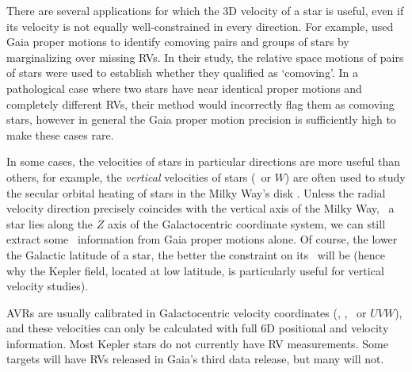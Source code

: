 There are several applications for which the 3D velocity of a star is useful,
even if its velocity is not equally well-constrained in every direction.
For example, \citet{oh2017} used Gaia proper motions to identify comoving
pairs and groups of stars by marginalizing over missing RVs.
In their study, the relative space motions of pairs of stars were used to
establish whether they qualified as `comoving'.
In a pathological case where two stars have near identical proper motions and
completely different RVs, their method would incorrectly flag them as comoving
stars, however in general the Gaia proper motion precision is sufficiently
high to make these cases rare.

In some cases, the velocities of stars in particular directions are more
useful than others, for example, the {\it vertical} velocities of stars (\vz\
or $W$) are often used to study the secular orbital heating of stars in the
Milky Way's disk \citep[\eg][]{beane2018, yu2018, ting2019, mackereth2019}.
Unless the radial velocity direction precisely coincides with the vertical
axis of the Milky Way, \ie\ a star lies along the $Z$ axis of the
Galactocentric coordinate system, we can still extract some \vz\ information
from Gaia proper motions alone.
Of course, the lower the Galactic latitude of a star, the better the
constraint on its \vz\ will be (hence why the Kepler field, located at low
latitude, is particularly useful for vertical velocity studies).

AVRs are usually calibrated in Galactocentric velocity coordinates (\vx, \vy,
\vz\ or $UVW$), and these velocities can only be calculated with full 6D
positional and velocity information.
Most Kepler stars do not currently have RV measurements.
Some targets will have RVs released in Gaia's third data release, but many
will not.

